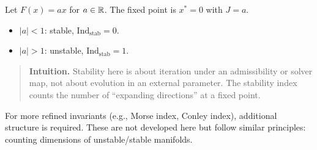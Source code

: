 \begin{example}
\label{ex:linear-stability}
Let $F(x) = ax$ for $a \in \mathbb{R}$.
The fixed point is $x^* = 0$ with $J = a$.
\begin{itemize}[itemsep=0.2em]
\item $|a| < 1$: stable, $\mathrm{Ind}_{\mathrm{stab}} = 0$.
\item $|a| > 1$: unstable, $\mathrm{Ind}_{\mathrm{stab}} = 1$.
\end{itemize}
\end{example}

\begin{quote}\small
\textbf{Intuition.}
Stability here is about iteration under an admissibility or solver map, not about evolution in an external parameter.
The stability index counts the number of ``expanding directions'' at a fixed point.
\end{quote}

\begin{remark}
For more refined invariants (e.g., Morse index, Conley index), additional structure is required.
These are not developed here but follow similar principles: counting dimensions of unstable/stable manifolds.
\end{remark}
